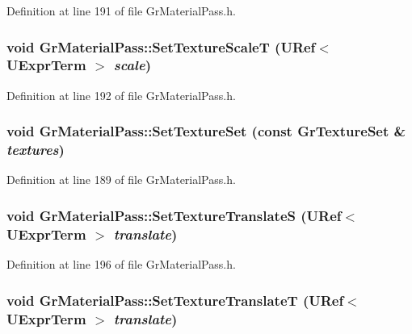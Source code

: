 Definition at line 191 of file GrMaterialPass.h.\hypertarget{class_gr_material_pass_d3e27ebf2fdecfcb84127dc777b41f71}{
\subsubsection[{SetTextureScaleT}]{\setlength{\rightskip}{0pt plus 5cm}void GrMaterialPass::SetTextureScaleT ({\bf URef}$<$ {\bf UExprTerm} $>$ {\em scale})}}
\label{class_gr_material_pass_d3e27ebf2fdecfcb84127dc777b41f71}




Definition at line 192 of file GrMaterialPass.h.\hypertarget{class_gr_material_pass_ae8284d3de34bd6668950b6b1fdeabdb}{
\subsubsection[{SetTextureSet}]{\setlength{\rightskip}{0pt plus 5cm}void GrMaterialPass::SetTextureSet (const {\bf GrTextureSet} \& {\em textures})}}
\label{class_gr_material_pass_ae8284d3de34bd6668950b6b1fdeabdb}




Definition at line 189 of file GrMaterialPass.h.\hypertarget{class_gr_material_pass_3cc6f6c62fe2f2e23a24069c20e5941c}{
\subsubsection[{SetTextureTranslateS}]{\setlength{\rightskip}{0pt plus 5cm}void GrMaterialPass::SetTextureTranslateS ({\bf URef}$<$ {\bf UExprTerm} $>$ {\em translate})}}
\label{class_gr_material_pass_3cc6f6c62fe2f2e23a24069c20e5941c}




Definition at line 196 of file GrMaterialPass.h.\hypertarget{class_gr_material_pass_b53e9d97ea01a7b4de5cd8c47d14235e}{
\subsubsection[{SetTextureTranslateT}]{\setlength{\rightskip}{0pt plus 5cm}void GrMaterialPass::SetTextureTranslateT ({\bf URef}$<$ {\bf UExprTerm} $>$ {\em translate})}}
\label{class_gr_material_pass_b53e9d97ea01a7b4de5cd8c47d14235e}




